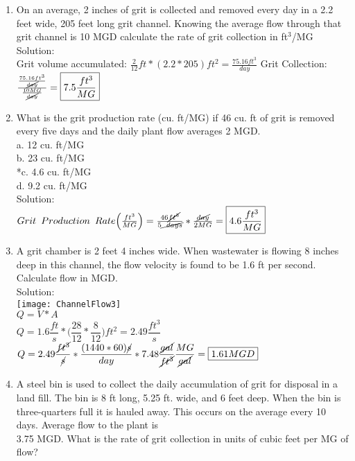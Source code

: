 \begin{enumerate}
\vspace{0.4cm}
\item On an average, 2 inches of grit is collected and removed every day in a 2.2 feet wide, 205 feet long grit channel.  Knowing the average flow through that grit channel is 10 MGD calculate the rate of grit collection in ft$^3$/MG\\
Solution:\\
Grit volume accumulated:  $\frac{2}{12}ft*(2.2*205)ft^2=\frac{75.16ft^3}{day}$
Grit Collection: $\frac{\frac{75.16ft^3}{\cancel{day}}}{\frac{10MG}{\cancel{day}}}=\boxed{7.5\frac{ft^3}{MG}}$ 

\vspace{0.4cm}
\item What is the grit production rate (cu. ft/MG) if 46 cu. ft of grit is removed every five days and the daily plant flow averages 2 MGD.\\

a. 12 cu. ft/MG \\
b. 23 cu. ft/MG \\
*c. 4.6 cu. ft/MG \\
d. 9.2 cu. ft/MG\\

Solution:\\
$Grit \enspace Production \enspace Rate\Big(\frac{ft^3}{MG}\Big)=\frac{46\cancel{ft^3}}{ 5\cancel{\enspace days}}*\frac{\cancel{day}}{2MG}=\boxed{4.6\frac{ft^3}{MG}}$


\vspace{0.4cm}
\item A grit chamber is 2 feet 4 inches wide. When wastewater is flowing 8 inches deep in this channel, the flow velocity is found to be 1.6 ft per second. Calculate flow in MGD.\\


Solution:\\
\vspace{0.3cm}
\texttt{[image: ChannelFlow3]}\\
$Q=V*A$\\
$Q=1.6\dfrac{ft}{s}*\Big(\dfrac{28}{12}*\dfrac{8}{12}\Big)ft^2=2.49\dfrac{ft^3}{s}$\\
$Q=2.49\dfrac{\cancel{ft^3}}{\cancel{s}}*\dfrac{(1440*60)\cancel{s}}{day}*7.48\dfrac{\cancel{gal}}{\cancel{ft^3}}\dfrac{MG}{\cancel{gal}}=\boxed{1.61MGD}$

\vspace{0.4cm}
\vspace{0.4cm}
\item  A steel bin is used to collect the daily accumulation of grit for disposal in a land fill. The bin is 8 ft long, 5.25 ft. wide, and 6 feet deep. When the bin is three-quarters full it is hauled away. This occurs on the average every 10 days. Average flow to the plant is \\3.75 MGD. What is the rate of grit collection in units of cubic feet per MG of flow?\\


\end{enumerate}
